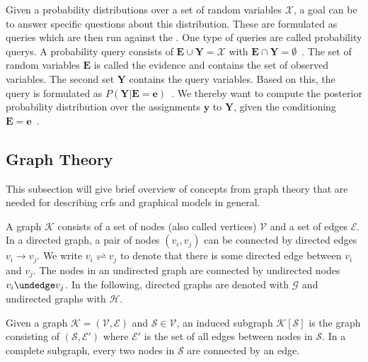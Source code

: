 \bigskip

Given a \glspl{probability distribution} over a set of \glspl{random variable} $\mathcal{X}$, a goal can be to answer specific questions about this distribution.
These are formulated as queries which are then run against the .
One type of queries are called \glspl{probability query}.
A \gls{probability query} consists of $\mathbf{E}\cup\mathbf{Y}=\mathcal{X}$ with $\mathbf{E}\cap\mathbf{Y}=\emptyset$~\citep{koller2009probabilistic}.
The set of \glspl{random variable} $\mathbf{E}$ is called the \gls{evidence} and contains the set of observed variables.
The second set $\mathbf{Y}$ contains the query variables.
Based on this, the query is formulated as $P(\mathbf{Y}|\mathbf{E}=\mathbf{e})$~\citep{koller2009probabilistic}.
We thereby want to compute the posterior \gls{probability distribution} over the assignments $\mathbf{y}$ to $\mathbf{Y}$, given the conditioning $\mathbf{E}=\mathbf{e}$~\citep{koller2009probabilistic}.

\subsection{Graph Theory}\label{subsec:graph-theory}

This subsection will give brief overview of concepts from graph theory that are needed for describing \glspl{crf} and graphical models in general.

\bigskip

A \gls{graph} $\mathcal{K}$ consists of a set of \glspl{node} (also called vertices) $\mathcal{V}$ and a set of \glspl{edge} $\mathcal{E}$.
In a directed \gls{graph}, a pair of \glspl{node} $(v_i,v_j)$ can be connected by directed \glspl{edge} $v_i\to v_j$.
We write $v_i\rightleftharpoons v_j$ to denote that there is some directed edge between $v_i$ and $v_j$.
The \glspl{node} in an undirected graph are connected by undirected \glspl{node} $v_i\undedge v_j$.
In the following, directed \glspl{graph} are denoted with $\mathcal{G}$ and undirected \glspl{graph} with $\mathcal{H}$.

Given a \gls{graph} $\mathcal{K} = (\mathcal{V},\mathcal{E})$ and $\mathcal{S}\in\mathcal{V}$, an induced \gls{subgraph} $\mathcal{K}[\mathcal{S}]$ is the \gls{graph} consisting of $(\mathcal{S},\mathcal{E'})$ where $\mathcal{E'}$ is the set of all \glspl{edge} between \glspl{node} in $\mathcal{S}$.
In a complete \gls{subgraph}, every two \glspl{node} in $\mathcal{S}$ are connected by an \gls{edge}.

